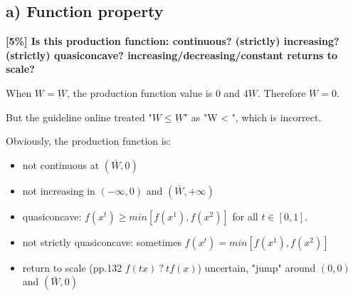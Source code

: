 \documentclass{article}
\begin{document}
\subsection{a) Function property}

\textbf{ [5\%] Is this production function: continuous? (strictly) increasing? (strictly) quasiconcave? increasing/decreasing/constant returns
to scale?}

\begin{mdframed}[backgroundcolor=blue!20,linecolor=white]

When $W = \underbar{W}$, the production function value is $0$ and $4\underbar{W}$. Therefore $\underbar{W} = 0$.

But the guideline online treated "$W \le \underbar{W}$" as "W < ", which is incorrect.

\begin{center}
\label{fig:hydro}
\end{center}
\vspace{2mm}

Obviously, the production function is:
\begin{itemize}
\item not continuous at $(\bar{W},0)$
\item not increasing in $(-\infty,0)$ and $(\bar{W},+\infty)$
\item quasiconcave: $f (x^t) \ge min[f (x^1), f (x^2)]$ for all $t ∈ [0, 1]$.
\item not strictly quasiconcave: sometimes $f (x^t) = min[f (x^1), f (x^2)]$
\item return to scale (pp.132 $f(tx) \ ? \ tf(x)$) uncertain, "jump" around $(0,0)$ and $(\bar{W},0)$
\end{itemize}
\end{mdframed}
\end{document}
